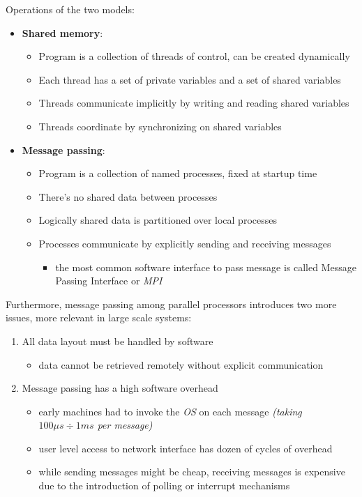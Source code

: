 \documentclass[english]{article}
\begin{document}
\bigskip
Operations of the two models:

\begin{itemize}
  \item \textbf{Shared memory}:
        \begin{itemize}
          \item Program is a collection of threads of control, can be created dynamically
          \item Each thread has a set of private variables and a set of shared variables
          \item Threads communicate implicitly by writing and reading shared variables
          \item Threads coordinate by synchronizing on shared variables
        \end{itemize}
  \item \textbf{Message passing}:
        \begin{itemize}
          \item Program is a collection of named processes, fixed at startup time
          \item There's no shared data between processes
          \item Logically shared data is partitioned over local processes
          \item Processes communicate by explicitly sending and receiving messages
                \begin{itemize}
                  \item the most common software interface to pass message is called Message Passing Interface or \textit{MPI}
                \end{itemize}
        \end{itemize}
\end{itemize}

\bigskip
Furthermore, message passing among parallel processors introduces two more issues, more relevant in large scale systems:

\begin{enumerate}
  \item All data layout must be handled by software
        \begin{itemize}
          \item data cannot be retrieved remotely without explicit communication
        \end{itemize}
  \item Message passing has a high software overhead
        \begin{itemize}
          \item early machines had to invoke the \textit{OS} on each message \textit{(taking \(100\mu s \div 1ms\) per message)}
          \item user level access to network interface has dozen of cycles of overhead
          \item while sending messages might be cheap, receiving messages is expensive due to the introduction of polling or interrupt mechanisms
        \end{itemize}
\end{enumerate}
\end{document}

